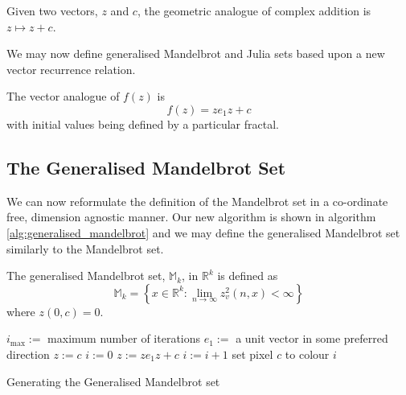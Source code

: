 \begin{definition}
Given two vectors, $z$ and $c$, the geometric analogue of complex addition
is $z \mapsto z + c$.
\end{definition}

We may now define generalised Mandelbrot and Julia sets based upon
a new vector recurrence relation.

\begin{definition}\label{def:gen_f(z)}
The vector analogue of $f(z)$ is 
\[
f(z) = ze_1z + c
\]
with initial values being defined by a particular fractal.
\end{definition}

\subsection{The Generalised Mandelbrot Set}

We can now reformulate the definition of the Mandelbrot set in a co-ordinate
free, dimension agnostic manner. Our new algorithm is shown in algorithm
\ref{alg:generalised_mandelbrot} and we may define the generalised
Mandelbrot set similarly to the Mandelbrot set.

\begin{definition}
The generalised Mandelbrot set, $\mathbb{M}_k$, in $\mathbb{R}^k$ 
    is defined as
\[
\mathbb{M}_k = 
\left\{x \in \mathbb{R}^k 
: \lim_{n \rightarrow \infty} z_v^2(n,x) < \infty \right\} 
\]
where $z(0,c) = 0$.
\end{definition}

\begin{fancyalg}
\begin{algorithmic}[1]
\STATE $i_{\mathrm{max}} :=$ maximum number of iterations
\STATE $e_1 :=$ a unit vector in some preferred direction
\STATE $z := c$
\STATE $i := 0$
  \STATE $z := ze_1z + c$
  \STATE $i := i+1$
\ENDWHILE 
\STATE set pixel $c$ to colour $i$
\ENDFOR
\end{algorithmic}
\caption{
\label{alg:generalised_mandelbrot}
  Generating the Generalised Mandelbrot set}
\end{fancyalg}

